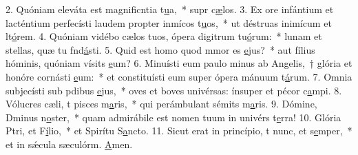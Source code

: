 2. Quóniam eleváta est magnificntia t\uline{u}a,~* supr c\uline{æ}los.
3. Ex ore infántium et lacténtium perfecísti laudem propter inmícos t\uline{u}os,~* ut déstruas inimícum et lt\uline{ó}rem.
4. Quóniam vidébo cælos tuos, ópera digitrum tu\uline{ó}rum:~* lunam et stellas, quæ tu fnd\uline{á}sti.
5. Quid est homo quod mmor es \uline{e}jus?~* aut fílius hóminis, quóniam vísits \uline{e}um?
6. Minuísti eum paulo minus ab Angelis,~† glória et honóre cornásti \uline{e}um:~* et constituísti eum super ópera mánuum t\uline{á}rum.
7. Omnia subjecísti sub pdibus \uline{e}jus,~* oves et boves univérsas: ínsuper et pécor c\uline{a}mpi.
8. Vólucres cæli, t pisces m\uline{a}ris,~* qui perámbulant sémits m\uline{a}ris.
9. Dómine, Dminus n\uline{o}ster,~* quam admirábile est nomen tuum in univérs t\uline{e}rra!
10. Glória Ptri, et F\uline{í}lio,~* et Spirítu S\uline{a}ncto.
11. Sicut erat in princípio, t nunc, et s\uline{e}mper,~* et in sǽcula sæculórm. \uline{A}men.
